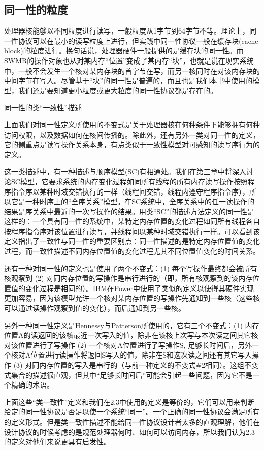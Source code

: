 \documentclass[UTF-8]{ctexrep}
\begin{document}
\subsection{同一性的粒度}
处理器核能够以不同粒度进行读写，一般粒度从1字节到64字节不等。理论上，同一性协议可以在最小的读写粒度上进行，但实践中同一性协议一般在缓存块(cache block)的粒度进行。换句话说，处理器硬件一般提供的是缓存块的同一性。而SWMR的操作对象也从对某内存“位置”变成了某内存“块”，也就是说在现实系统中，一般不会发生一个核对某内存块的首字节在写，而另一核同时在对该内存块的中间字节在写入。尽管基于“块”的同一性是普遍的，而且也是我们本书中使用的模型，我们还是要知道更小粒度或更大粒度的同一性协议都是存在的。
\begin{sidebarbox}
\par 同一性的类“一致性”描述
\par 上面我们对同一性定义所使用的不变式是关于处理器核在何种条件下能够拥有何种访问权限，以及数据如何在核间传播的。除此外，还有另外一类对同一性的定义，它的侧重点是读写操作关系本身，有点类似于一致性模型对可感知的读写序行为的定义。
\par 这一类描述中，有一种描述与顺序模型(SC)有相通处。我们在第三章中将深入讨论SC模型，它要求系统的内存变化过程如同所有线程的所有内存读写操作按照程序指令序以某种时域交错执行的一样（线程间交错，线程内遵守程序指令序），所以它是一种时序上的“全序关系”模型。在SC系统中，全序关系中的任一读操作的结果是序关系中最近的一次写操作的结果。用类“SC”的描述方法定义的同一性是这样的：一个具有同一性的系统中，某特定内存位置的变化过程如同所有线程各自按程序指令序对该位置进行读写，并线程间以某种时域交错执行一样。可以看到该定义指出了一致性与同一性的重要区别点：同一性描述的是特定内存位置值的变化过程，而一致性描述不同内存位置值的变化过程尤其不同位置值变化的时间关系。
\par 还有一种对同一性的定义也是使用了两个不变式：(1) 每个写操作最终都会被所有核观察到  (2) 对同内存位置的写操作是串行进行的（即，所有核观察到的该内存位置值的变化过程是相同的）。IBM在Power中使用了类似的定义以使得其硬件实现更加容易，因为该模型允许一个核对某内存位置的写操作先通知到一些核（这些核可以通过读操作观察到值的变化），而后通知到另一些核。
\par 另外一种同一性定义是Hennessy与Patterson所使用的，它有三个不变式：(1) 内存位置A的读返回的该核最近一次写入的值，除非在该核上次写与本次读之间其它核对该位置进行了写操作 (2)  一个核对A位置进行了写操作S,  足够长时间后，另外一个核对A位置进行读操作将返回S写入的值，除非在S和这次读之间还有其它写入操作  (3) 对同内存位置的写入是串行的（与前一种定义的不变式\#2相同）。这组不变式集合的描述很直观，但其中“足够长时间后”可能会引起一些问题，因为它不是一个精确的术语。
\par 上面这些“类一致性”定义和我们在2.3中使用的定义是等价的，它们可以用来判断给定的同一性协议是否足以使一个系统“同一”。一个正确的同一性协议会满足所有的定义形式。但是类一致性描述不能给同一性协议设计者太多的直观理解，他们在设计协议的时候考虑的是规范处理器何时、如何可以访问内存，所以我们认为2.3的定义对他们来说更具有启发性。
\end{sidebarbox}
\end{document}
